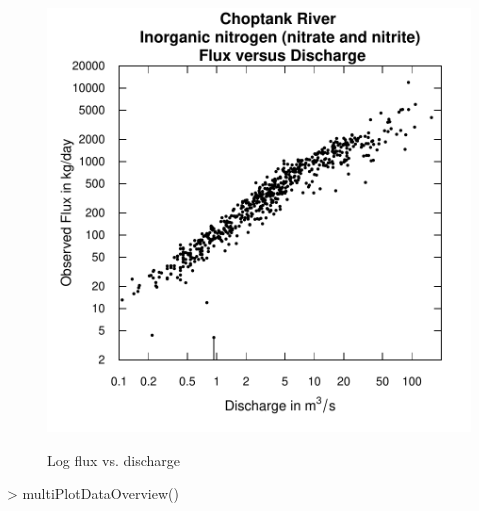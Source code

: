 \documentclass[a4paper,11pt]{article}
\begin{document}
\begin{figure}[htbp]
  \begin{minipage}[h]{0.5\linewidth}
    \begin{center}

\includegraphics{EGRET-figplotLogFluxQ}
    \label{fig:plotLogFluxQ}
    \end{center}
  \end{minipage}
  \hspace{0.5cm}
  
  \caption{Log flux vs. discharge}
  \label{fig:plotLogFluxQMain}
\end{figure}

\begin{Schunk}
\begin{Sinput}
> multiPlotDataOverview()
\end{Sinput}
\end{Schunk}
\end{document}
